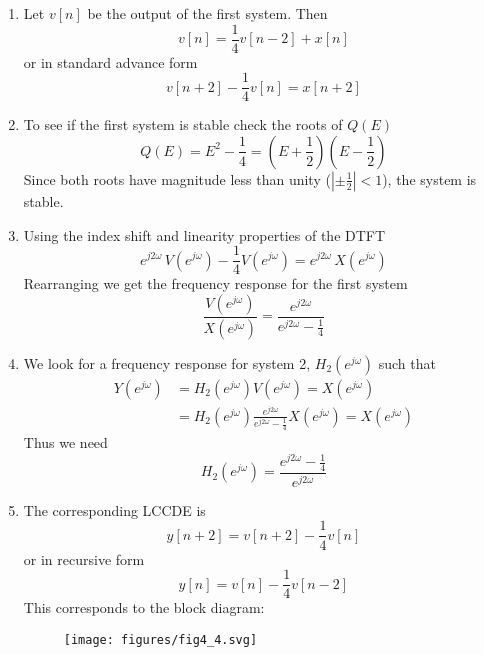 \documentclass{article}
\begin{document}
\begin{enumerate}
\item Let $v[n]$ be the output of the first system. Then
  \[
  v[n] = \frac{1}{4} v[n-2] + x[n]
  \]
  or in standard advance form
  \[
  v[n+2] - \frac{1}{4} v[n] = x[n+2]
  \]

\item To see if the first system is stable check the roots of $Q(E)$
  \[
  Q(E) = E^2 - \frac{1}{4} = \left(E + \frac{1}{2}\right)\left(E - \frac{1}{2}\right)
  \]
  Since both roots have magnitude less than unity ($|\pm \frac{1}{2}| < 1$), the system is stable.

\item Using the index shift and linearity properties of the DTFT
  \[
  e^{j2\omega}\, V\left( e^{j\omega} \right) - \frac{1}{4} V\left( e^{j\omega} \right) = e^{j2\omega}\, X\left( e^{j\omega} \right)
  \]
  Rearranging we get the frequency response for the first system
  \[
  \frac{V\left( e^{j\omega} \right)}{X\left( e^{j\omega} \right)} = \frac{e^{j2\omega}}{e^{j2\omega}-\frac{1}{4}}
  \]

\item We look for a frequency response for system 2, $H_2\left( e^{j\omega} \right)$ such that
  \begin{align}
    Y\left( e^{j\omega} \right) &= H_2\left( e^{j\omega} \right)V\left( e^{j\omega} \right) = X\left( e^{j\omega} \right)\\
    &= H_2\left( e^{j\omega} \right)\frac{e^{j2\omega}}{e^{j2\omega}-\frac{1}{4}}X\left( e^{j\omega} \right)  = X\left( e^{j\omega} \right)
  \end{align}
  Thus we need
  \[
  H_2\left( e^{j\omega} \right) = \frac{e^{j2\omega}-\frac{1}{4}}{e^{j2\omega}}
  \]

\item The corresponding LCCDE is
  \[
  y[n+2] = v[n+2] - \frac{1}{4} v[n]
  \]
  or in recursive form
  \[
  y[n] = v[n] - \frac{1}{4}v[n-2]
  \]
  This corresponds to the block diagram:
  \begin{figure}
  \centering
  \texttt{[image: figures/fig4\_4.svg]}
  \end{figure}
  
\end{enumerate}
\end{document}
